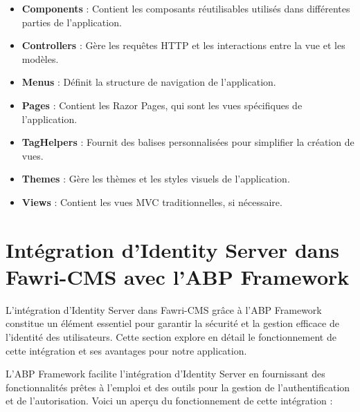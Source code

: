 \begin{itemize}

    \item \textbf{Components} : Contient les composants réutilisables utilisés dans différentes parties de l'application.

    \item \textbf{Controllers} : Gère les requêtes HTTP et les interactions entre la vue et les modèles.

    \item \textbf{Menus} : Définit la structure de navigation de l'application.

    \item \textbf{Pages} : Contient les Razor Pages, qui sont les vues spécifiques de l'application.

    \item \textbf{TagHelpers} : Fournit des balises personnalisées pour simplifier la création de vues.

    \item \textbf{Themes} : Gère les thèmes et les styles visuels de l'application.

    \item \textbf{Views} : Contient les vues MVC traditionnelles, si nécessaire.

\end{itemize}




\section{Intégration d'Identity Server dans Fawri-CMS avec l'ABP Framework}

\hspace{\parindent}L'intégration d'Identity Server dans Fawri-CMS grâce à l'ABP Framework constitue un élément essentiel pour garantir la sécurité et la gestion efficace de l'identité des utilisateurs. Cette section explore en détail le fonctionnement de cette intégration et ses avantages pour notre application.

L'ABP Framework facilite l'intégration d'Identity Server en fournissant des fonctionnalités prêtes à l'emploi et des outils pour la gestion de l'authentification et de l'autorisation. Voici un aperçu du fonctionnement de cette intégration :

